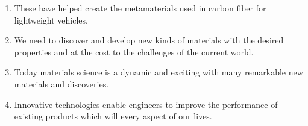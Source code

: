 \begin{enumerate}
      \item These \underline{\hspace{2cm}} have helped create the metamaterials used in carbon fiber \underline{\hspace{1,5cm}} for lightweight vehicles.
      \item We need to discover and develop new kinds of materials with the desired properties and at the \underline{\hspace{2cm}} cost to \underline{\hspace{2cm}} the challenges of the current world.
      \item Today materials science is a dynamic and exciting \underline{\hspace{2cm}} with many remarkable new materials and discoveries.
      \item Innovative technologies enable engineers to improve the performance of existing products which will \underline{\hspace{2cm}} every aspect of our lives.
\end{enumerate}

